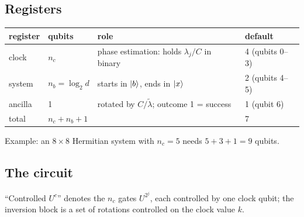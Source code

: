 \documentclass[11pt,a4paper,openany]{book}
\newcommand{\lt}{\tilde\lambda}
\begin{document}
\subsection{Registers}
\begin{center}\small
\begin{tabular}{llll}
\toprule register & qubits & role & default\\ \midrule
clock & $n_c$ & phase estimation: holds $\lambda_j/C$ in binary & 4 (qubits 0--3)\\
system & $n_b = \log_2d$ & starts in $\ket b$, ends in $\ket x$ & 2 (qubits 4--5)\\
ancilla & 1 & rotated by $C/\lt$; outcome 1 = success & 1 (qubit 6)\\ \midrule
total & $n_c + n_b + 1$ & & 7\\ \bottomrule
\end{tabular}
\end{center}
Example: an $8\times8$ Hermitian system with $n_c = 5$ needs $5 + 3 + 1 = 9$ qubits.

\subsection{The circuit}
\begin{center}
\end{center}
``Controlled $U^c$'' denotes the $n_c$ gates $U^{2^j}$, each controlled by one clock qubit; the inversion block is a set of rotations controlled on the
clock value $k$.
\end{document}

